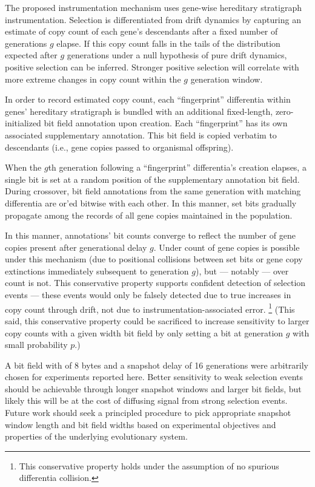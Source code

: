 The proposed instrumentation mechanism uses gene-wise hereditary stratigraph instrumentation.
Selection is differentiated from drift dynamics by capturing an estimate of copy count of each gene's descendants after a fixed number of generations $g$ elapse.
If this copy count falls in the tails of the distribution expected after $g$ generations under a null hypothesis of pure drift dynamics, positive selection can be inferred.
Stronger positive selection will correlate with more extreme changes in copy count within the $g$ generation window.

In order to record estimated copy count, each ``fingerprint'' differentia within genes' hereditary stratigraph is bundled with an additional fixed-length, zero-initialized bit field annotation upon creation.
Each ``fingerprint'' has its own associated supplementary annotation.
This bit field is copied verbatim to descendants (i.e., gene copies passed to organismal offspring).

When the $g$th generation following a ``fingerprint'' differentia's creation elapses, a single bit is set at a random position of the supplementary annotation bit field.
During crossover, bit field annotations from the same generation with matching differentia are or'ed bitwise with each other.
In this manner, set bits gradually propagate among the records of all gene copies maintained in the population.

In this manner, annotations' bit counts converge to reflect the number of gene copies present after generational delay $g$.
Under count of gene copies is possible under this mechanism (due to positional collisions between set bits or gene copy extinctions immediately subsequent to generation $g$), but --- notably --- over count is not.
This conservative property supports confident detection of selection events --- these events would only be falsely detected due to true increases in copy count through drift, not due to instrumentation-associated error.
\footnote{This conservative property holds under the assumption of no spurious differentia collision.}
(This said, this conservative property could be sacrificed to increase sensitivity to larger copy counts with a given width bit field by only setting a bit at generation $g$ with small probability $p$.)

A bit field with of 8 bytes and a snapshot delay of 16 generations were arbitrarily chosen for experiments reported here.
Better sensitivity to weak selection events should be achievable through longer snapshot windows and larger bit fields, but likely this will be at the cost of diffusing signal from strong selection events.
Future work should seek a principled procedure to pick appropriate snapshot window length and bit field widths based on experimental objectives and properties of the underlying evolutionary system.

